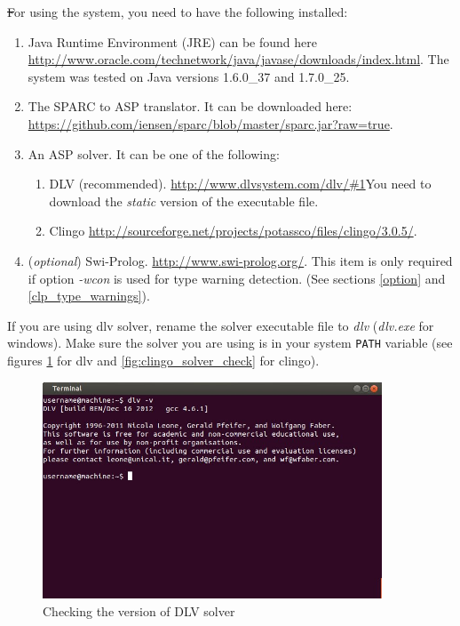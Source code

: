 \documentclass[12pt, letterpaper]{article}
\begin{document}
\st For using the system, you need to have the following installed:
\begin{enumerate}
\item Java Runtime Environment (JRE) can be found here \url{http://www.oracle.com/technetwork/java/javase/downloads/index.html}.
The system was tested on Java versions 1.6.0\_37 and 1.7.0\_25.
\item The SPARC to ASP translator. It can be downloaded here: \url{https://github.com/iensen/sparc/blob/master/sparc.jar?raw=true}.
\item An ASP solver. It can be one of the following:
\begin{enumerate} 
\item DLV (recommended).
 \url{http://www.dlvsystem.com/dlv/#1}You need to download the \textit{static} version of the executable file.
\item Clingo \url{http://sourceforge.net/projects/potassco/files/clingo/3.0.5/}.
\end{enumerate}

\item (\textit{optional}) Swi-Prolog. \url{http://www.swi-prolog.org/}. This item is only required if option \textit{-wcon} is used for type warning detection.
(See sections \ref{option} and \ref{clp_type_warnings}).

\end{enumerate}
If you are using dlv solver, rename the solver executable file to \textit{dlv} (\textit{dlv.exe} for windows).
Make sure the solver you are using is in your system \texttt{PATH} variable (see figures \ref{fig:dlv_solver_check} for dlv and \ref{fig:clingo_solver_check} for clingo).

\begin{figure}[p]
\centering
\includegraphics[width=0.9\textwidth]{dlv_version.jpg}
\caption{Checking the version of DLV solver}
\label{fig:dlv_solver_check}
\end{figure}
\end{document}
